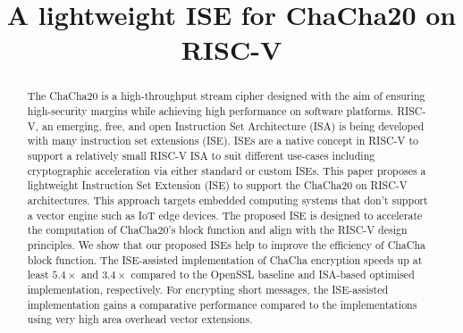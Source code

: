 \documentclass[conference]{IEEEtran}
\begin{document}

\title{A lightweight ISE for ChaCha20 on RISC-V}
%


\maketitle


\begin{abstract}
The ChaCha20 is a high-throughput stream cipher designed with the aim of ensuring high-security margins while achieving high performance on software platforms. RISC-V, an emerging, free, and open Instruction Set Architecture (ISA) is being developed with many instruction set extensions (ISE). ISEs are a native concept in RISC-V to support a relatively small RISC-V ISA to suit different use-cases including cryptographic acceleration via either standard or custom ISEs. This paper proposes a lightweight Instruction Set Extension (ISE) to support the ChaCha20 on RISC-V architectures. This approach targets embedded computing systems that don't support a vector engine such as IoT edge devices. The proposed ISE is designed to accelerate the computation of ChaCha20's block function and align with the  RISC-V design principles. We show that our proposed ISEs help to improve the efficiency of ChaCha block function. 
The ISE-assisted implementation of ChaCha encryption speeds up at least $5.4\times$ and $3.4\times$ compared to the OpenSSL baseline and ISA-based optimised implementation, respectively. 
For encrypting short messages, the ISE-assisted implementation gains a comparative performance compared to the implementations using very high area overhead vector extensions.
\end{abstract}
\end{document}
